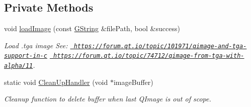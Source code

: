 \subsection*{Private Methods}
\begin{DoxyCompactItemize}
\item 
\mbox{\label{classrev_1_1_image_a25544240ae630de872c3d906025d783c}} 
void \mbox{\hyperlink{classrev_1_1_image_a25544240ae630de872c3d906025d783c}{load\+Image}} (const \mbox{\hyperlink{classrev_1_1_g_string}{G\+String}} \&file\+Path, bool \&success)
\begin{DoxyCompactList}\small\item\em Load .tga image See\+: \href{https://forum.qt.io/topic/101971/qimage-and-tga-support-in-c}{\texttt{ https\+://forum.\+qt.\+io/topic/101971/qimage-\/and-\/tga-\/support-\/in-\/c}} \href{https://forum.qt.io/topic/74712/qimage-from-tga-with-alpha/11}{\texttt{ https\+://forum.\+qt.\+io/topic/74712/qimage-\/from-\/tga-\/with-\/alpha/11}}. \end{DoxyCompactList}\item 
\mbox{\label{classrev_1_1_image_aed8d64926a7e519304bd9539ebaa9aa9}} 
static void \mbox{\hyperlink{classrev_1_1_image_aed8d64926a7e519304bd9539ebaa9aa9}{Clean\+Up\+Handler}} (void $\ast$image\+Buffer)
\begin{DoxyCompactList}\small\item\em Cleanup function to delete buffer when last Q\+Image is out of scope. \end{DoxyCompactList}\end{DoxyCompactItemize}
